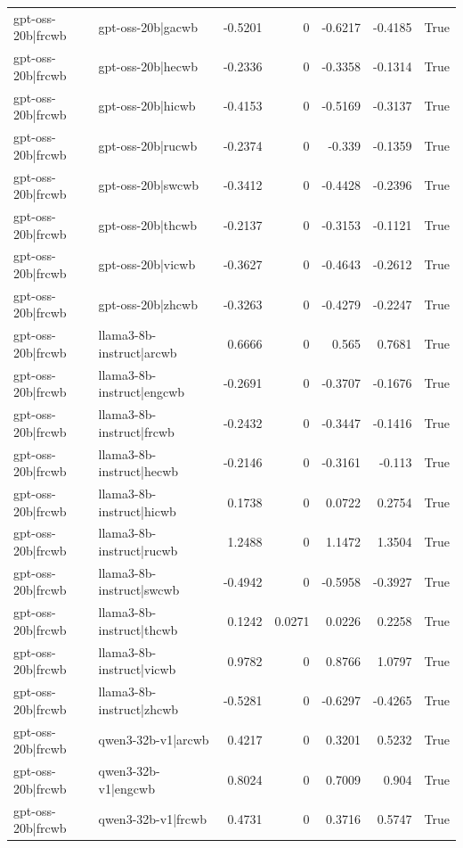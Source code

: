 \begin{table}
\begin{tabular}{l l r r r r l}
gpt-oss-20b|frcwb & gpt-oss-20b|gacwb & -0.5201 & 0 & -0.6217 & -0.4185 & True \\
gpt-oss-20b|frcwb & gpt-oss-20b|hecwb & -0.2336 & 0 & -0.3358 & -0.1314 & True \\
gpt-oss-20b|frcwb & gpt-oss-20b|hicwb & -0.4153 & 0 & -0.5169 & -0.3137 & True \\
gpt-oss-20b|frcwb & gpt-oss-20b|rucwb & -0.2374 & 0 & -0.339 & -0.1359 & True \\
gpt-oss-20b|frcwb & gpt-oss-20b|swcwb & -0.3412 & 0 & -0.4428 & -0.2396 & True \\
gpt-oss-20b|frcwb & gpt-oss-20b|thcwb & -0.2137 & 0 & -0.3153 & -0.1121 & True \\
gpt-oss-20b|frcwb & gpt-oss-20b|vicwb & -0.3627 & 0 & -0.4643 & -0.2612 & True \\
gpt-oss-20b|frcwb & gpt-oss-20b|zhcwb & -0.3263 & 0 & -0.4279 & -0.2247 & True \\
gpt-oss-20b|frcwb & llama3-8b-instruct|arcwb & 0.6666 & 0 & 0.565 & 0.7681 & True \\
gpt-oss-20b|frcwb & llama3-8b-instruct|engcwb & -0.2691 & 0 & -0.3707 & -0.1676 & True \\
gpt-oss-20b|frcwb & llama3-8b-instruct|frcwb & -0.2432 & 0 & -0.3447 & -0.1416 & True \\
gpt-oss-20b|frcwb & llama3-8b-instruct|hecwb & -0.2146 & 0 & -0.3161 & -0.113 & True \\
gpt-oss-20b|frcwb & llama3-8b-instruct|hicwb & 0.1738 & 0 & 0.0722 & 0.2754 & True \\
gpt-oss-20b|frcwb & llama3-8b-instruct|rucwb & 1.2488 & 0 & 1.1472 & 1.3504 & True \\
gpt-oss-20b|frcwb & llama3-8b-instruct|swcwb & -0.4942 & 0 & -0.5958 & -0.3927 & True \\
gpt-oss-20b|frcwb & llama3-8b-instruct|thcwb & 0.1242 & 0.0271 & 0.0226 & 0.2258 & True \\
gpt-oss-20b|frcwb & llama3-8b-instruct|vicwb & 0.9782 & 0 & 0.8766 & 1.0797 & True \\
gpt-oss-20b|frcwb & llama3-8b-instruct|zhcwb & -0.5281 & 0 & -0.6297 & -0.4265 & True \\
gpt-oss-20b|frcwb & qwen3-32b-v1|arcwb & 0.4217 & 0 & 0.3201 & 0.5232 & True \\
gpt-oss-20b|frcwb & qwen3-32b-v1|engcwb & 0.8024 & 0 & 0.7009 & 0.904 & True \\
gpt-oss-20b|frcwb & qwen3-32b-v1|frcwb & 0.4731 & 0 & 0.3716 & 0.5747 & True \\

\end{tabular}
\end{table}
